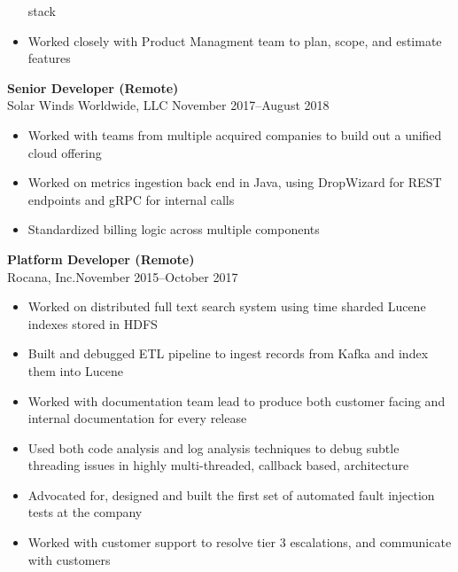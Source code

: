 \documentclass[margin]{res}
\begin{document}
\begin{resume}
\begin{itemize}
            stack
        \item Worked closely with Product Managment team to plan, scope, and
            estimate features
    \end{itemize}
{\bf Senior Developer (Remote)} \\
    Solar Winds Worldwide, LLC \hfill November 2017--August 2018
    \begin{itemize}
        \item Worked with teams from multiple acquired companies to build out
            a unified cloud offering
        \item Worked on metrics ingestion back end in Java, using DropWizard
            for REST endpoints and gRPC for internal calls
        \item Standardized billing logic across multiple components
    \end{itemize}
{\bf Platform Developer (Remote)}\\
    Rocana, Inc.\hfill November 2015--October 2017
\begin{itemize}
    \item Worked on distributed full text search system using time sharded
        Lucene indexes stored in HDFS
    \item Built and debugged ETL pipeline to ingest records from Kafka
        and index them into Lucene
    \item Worked with documentation team lead to produce both customer facing
        and internal documentation for every release
    \item Used both code analysis and log analysis techniques to debug subtle
        threading issues in highly multi-threaded, callback based, architecture
    \item Advocated for, designed and built the first set of automated fault
        injection tests at the company
    \item Worked with customer support to resolve tier 3 escalations, and
        communicate with customers
\end{itemize}


\end{resume}
\end{document}
